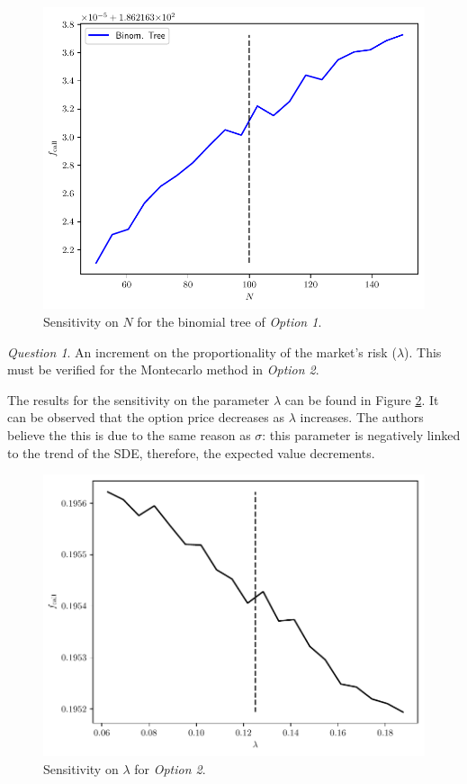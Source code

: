 \documentclass[11pt]{article}
\theoremstyle{definition}
\theoremstyle{remark}
\theoremstyle{remark}
\newtheorem{question}{Question}
\begin{document}
\begin{figure}[H]
    \centering
    \includegraphics[scale=0.5]{../plts/seventh_sens_opt1.pdf}
    \caption{Sensitivity on $N$ for the binomial tree of \textit{Option 1}.}
    \label{fig:seventh_sens}
\end{figure}

\begin{question}
  An increment on the proportionality of the market's risk ($\lambda$). This
  must be verified for the Montecarlo method in \textit{Option 2}.
\end{question}
The results for the sensitivity on the parameter $\lambda$ can be found in
Figure \ref{fig:eight_sens}. It can be observed that the option price decreases
as $\lambda$ increases. The authors believe the this is due to the same reason
as $\sigma$: this parameter is negatively linked to the trend of the SDE,
therefore, the expected value decrements.

\begin{figure}[H]
    \centering
    \includegraphics[scale=0.5]{../plts/eight_sens_opt2.pdf}
    \caption{Sensitivity on $\lambda$ for \textit{Option 2}.}
    \label{fig:eight_sens}
\end{figure}


\printbibliography
\end{document}
